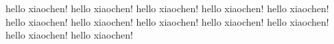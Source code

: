 hello xiaochen!
hello xiaochen!
hello xiaochen!
hello xiaochen!
hello xiaochen!
hello xiaochen!
hello xiaochen!
hello xiaochen!
hello xiaochen!
hello xiaochen!
hello xiaochen!
hello xiaochen!
